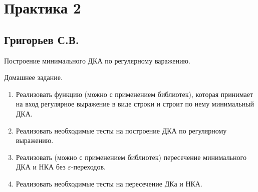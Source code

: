 \section{Практика 2}

\subsection{Григорьев С.В.}

Построение минимального ДКА по регулярному варажению.

Домашнее задание.
\begin{enumerate}
	\item Реализовать функцию (можно с применением библиотек), которая принимает на вход регулярное выражение в виде строки и строит по нему минимальный ДКА.
	\item Реализовать необходимые тесты на построение ДКА по регулярному выражению.
	\item Реализовать (можно с применением библиотек) пересечение минимального ДКА и НКА без $\varepsilon$-переходов.
	\item Реализовать необходимые тесты на пересечение ДКа и НКА.
\end{enumerate}










